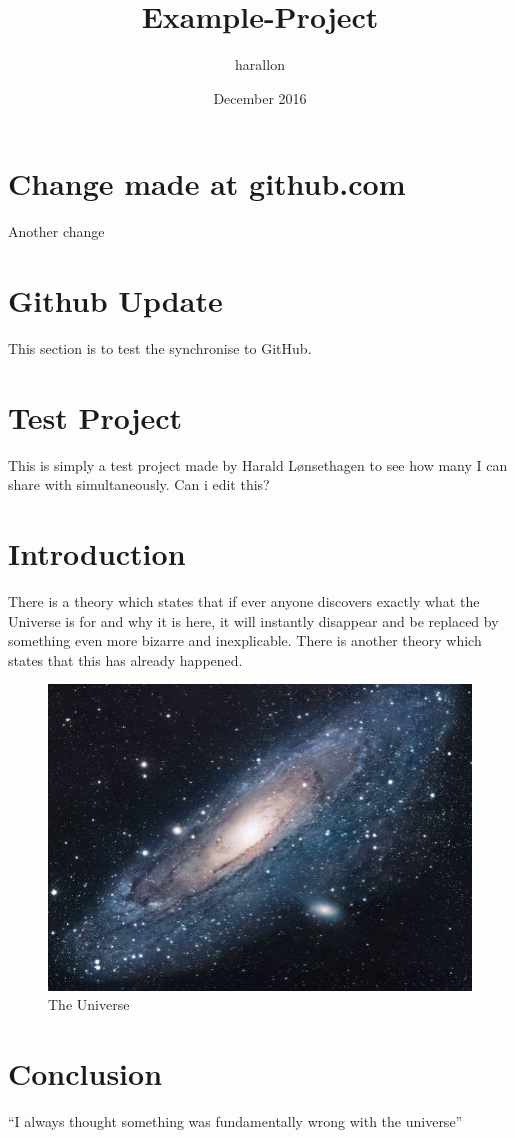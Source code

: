 \documentclass{article}
\title{Example-Project}
\author{harallon }
\date{December 2016}
\begin{document}
\maketitle

\section{Change made at github.com}
Another change

\section{Github Update}
This section is to test the synchronise to GitHub. 

\section{Test Project}
This is simply a test project made by Harald Lønsethagen to see how many I can share with simultaneously.
Can i edit this?

\section{Introduction}
There is a theory which states that if ever anyone discovers exactly what the Universe is for and why it is here, it will instantly disappear and be replaced by something even more bizarre and inexplicable.
There is another theory which states that this has already happened.

\begin{figure}[h!]
\centering
\includegraphics[scale=1.7]{universe.jpg}
\caption{The Universe}
\label{fig:univerise}
\end{figure}

\section{Conclusion}
``I always thought something was fundamentally wrong with the universe'' \citep{adams1995hitchhiker}



\end{document}
